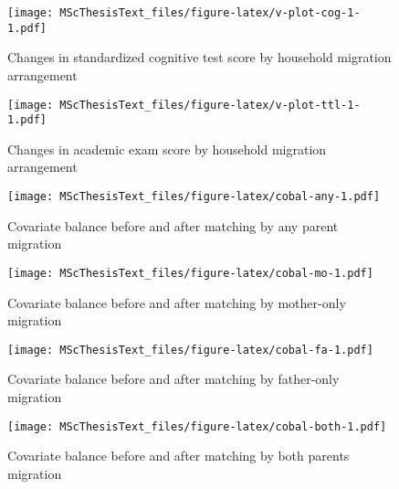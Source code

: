 \documentclass[
  man,floatsintext]{apa7}
\begin{document}
\newpage

\begin{figure}
\centering
\texttt{[image: MScThesisText\_files/figure-latex/v-plot-cog-1-1.pdf]}
\caption{\label{fig:v-plot-cog-1}Changes in standardized cognitive test score by household migration arrangement}
\end{figure}

\newpage

\begin{figure}
\centering
\texttt{[image: MScThesisText\_files/figure-latex/v-plot-ttl-1-1.pdf]}
\caption{\label{fig:v-plot-ttl-1}Changes in academic exam score by household migration arrangement}
\end{figure}

\newpage











\begin{figure}
\centering
\texttt{[image: MScThesisText\_files/figure-latex/cobal-any-1.pdf]}
\caption{\label{fig:cobal-any}Covariate balance before and after matching by any parent migration}
\end{figure}

\newpage

\begin{figure}
\centering
\texttt{[image: MScThesisText\_files/figure-latex/cobal-mo-1.pdf]}
\caption{\label{fig:cobal-mo}Covariate balance before and after matching by mother-only migration}
\end{figure}

\newpage

\begin{figure}
\centering
\texttt{[image: MScThesisText\_files/figure-latex/cobal-fa-1.pdf]}
\caption{\label{fig:cobal-fa}Covariate balance before and after matching by father-only migration}
\end{figure}

\newpage

\begin{figure}
\centering
\texttt{[image: MScThesisText\_files/figure-latex/cobal-both-1.pdf]}
\caption{\label{fig:cobal-both}Covariate balance before and after matching by both parents migration}
\end{figure}

\newpage
\end{document}

